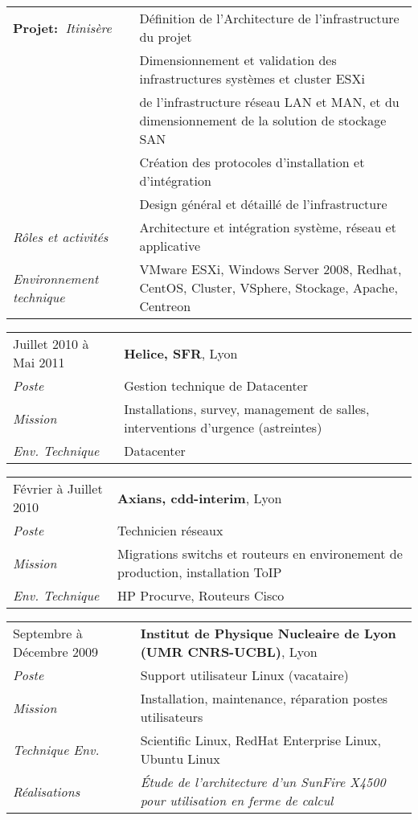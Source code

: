 \documentclass[a4paper,8pt]{article}
\begin{document}
\begin{tabular}{P{3.5cm}|p{13cm}}
\textbf{Projet:~}\textit{Itinisère}	& Définition de l’Architecture de l'infrastructure du projet\\
				& Dimensionnement et validation des infrastructures systèmes et cluster ESXi\\
				& de l'infrastructure réseau LAN et MAN, et du dimensionnement de la solution de stockage SAN\\
				& Création des protocoles d'installation et d'intégration\\
				& Design général et détaillé de l'infrastructure\\
\textsl{Rôles et activités}	& Architecture et intégration système, réseau et applicative\\
\textsl{Environnement technique} & VMware ESXi, Windows Server 2008, Redhat, CentOS, Cluster, VSphere, Stockage, Apache, Centreon\\
\end{tabular}

\begin{tabular}{P{3.5cm}|p{13cm}}
Juillet 2010 à Mai 2011	& \textbf{Helice, SFR}, Lyon\\
\textsl{Poste}			& Gestion technique de Datacenter\\
\textsl{Mission}		& Installations, survey, management de salles, interventions d'urgence (astreintes)\\
\textsl{Env. Technique}		& Datacenter\\
\end{tabular}

\begin{tabular}{P{3.5cm}|p{13cm}}
Février à Juillet 2010	& \textbf{Axians, cdd-interim}, Lyon\\
\textsl{Poste}	 		& Technicien réseaux\\
\textsl{Mission}		& Migrations switchs et routeurs en environement de production, installation ToIP\\
\textsl{Env. Technique}		& HP Procurve, Routeurs Cisco\\
\end{tabular}

\begin{tabular}{P{3.5cm}|p{13cm}}
Septembre à Décembre 2009	& \textbf{Institut de Physique Nucleaire de Lyon (UMR CNRS-UCBL)}, Lyon\\
\textsl{Poste}	 		& Support utilisateur Linux (vacataire)\\
\textsl{Mission} 		& Installation, maintenance, réparation postes utilisateurs\\
\textsl{Technique Env.}		& Scientific Linux, RedHat Enterprise Linux, Ubuntu Linux\\
\textsl{Réalisations}		& \textsl{\'{E}tude de l'architecture d'un SunFire X4500 pour utilisation en ferme de calcul}\\
\end{tabular}
\end{document}
